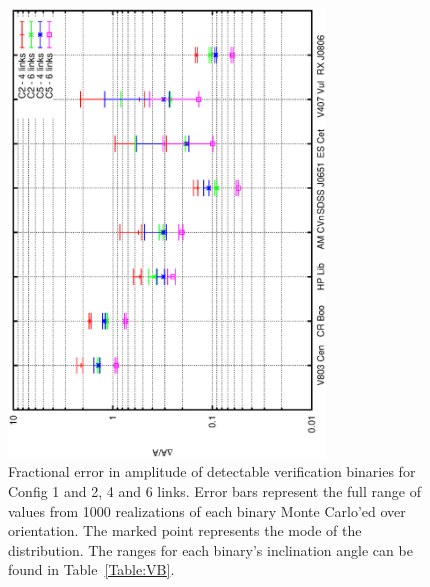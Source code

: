 \documentclass{iopart}
\begin{document}
\begin{figure}[H]
\begin{center}
   \includegraphics[angle=270, width=0.75\textwidth]{FigGBTyson/Amp.eps} %
   \caption{Fractional error in amplitude of detectable verification binaries for Config 1 and 2, 4 and 6 links.  Error bars represent the full range of values from 1000 realizations of each binary Monte Carlo'ed over orientation.  The marked point represents the mode of the distribution.  The ranges for each binary's inclination angle can be found in Table~\ref{Table:VB}.}
   \label{Figure:VBAmp}
   \end{center}
\end{figure}
\end{document}
